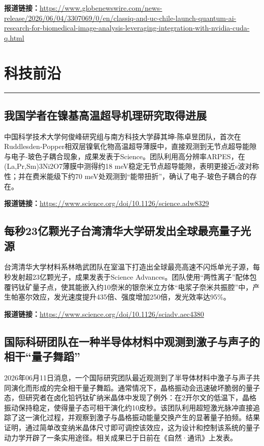 \documentclass[12pt,a4paper]{ctexart}
\begin{document}
\noindent\textbf{报道链接：}\url{https://www.globenewswire.com/news-release/2026/06/04/3307069/0/en/classiq-and-uc-chile-launch-quantum-ai-research-for-biomedical-image-analysis-leveraging-integration-with-nvidia-cuda-q.html}


\newpage
\section{科技前沿}
\vspace{-0.5em}
\noindent\rule{\linewidth}{1.5pt}

\subsection{ 我国学者在镍基高温超导机理研究取得进展 }

中国科学技术大学何俊峰研究组与南方科技大学薛其坤-陈卓昱团队，首次在Ruddlesden‑Popper相双层镍氧化物高温超导薄膜中，直接观测到无节点超导能隙与电子‑玻色子耦合现象，成果发表于Science。团队利用高分辨率ARPES，在(La,Pr,Sm)3Ni2O7薄膜中测得约18 meV稳定无节点超导能隙，表明更接近s波对称性；并在费米能级下约70 meV处观测到“能带扭折”，确认了电子-玻色子耦合的存在。

\noindent\textbf{报道链接：}\url{https://www.science.org/doi/10.1126/science.adw8329}

\subsection{ 每秒23亿颗光子台湾清华大学研发出全球最亮量子光源 }

台湾清华大学材料系林皓武团队在室温下打造出全球最亮高速不闪烁单光子源，每秒发射超23亿颗光子，成果发表于Science Advances。团队使用“两性离子”配体包覆钙钛矿量子点，使其能嵌入约10奈米的银奈米立方体“电浆子奈米共振腔”中，产生帕塞尔效应，发光速度提升435倍、强度增加250倍，发光效率达95\%。

\noindent\textbf{报道链接：}\url{https://www.science.org/doi/10.1126/sciadv.aec4380}

\subsection{ 国际科研团队在一种半导体材料中观测到激子与声子的相干“量子舞蹈” }

2026年06月11日消息，一个国际研究团队最近观测到了半导体材料中激子与声子共同演化而形成的完全相干量子舞蹈。通常情况下，晶格振动会迅速破坏脆弱的量子态，但研究者在卤化铅钙钛矿纳米晶体中发现了例外：在2开尔文的低温下，晶格振动保持稳定，使得量子态可相干演化约10皮秒。该团队利用超短激光脉冲直接追踪了这一演化过程，并观察到激子与晶格振动能量交换产生的显著量子拍频。结果证明，通过简单改变纳米晶体尺寸即可调控该效应，这为设计和控制该系统的量子动力学开辟了一条实用途径。相关成果已于日前在《自然·通讯》上发表。
\end{document}
